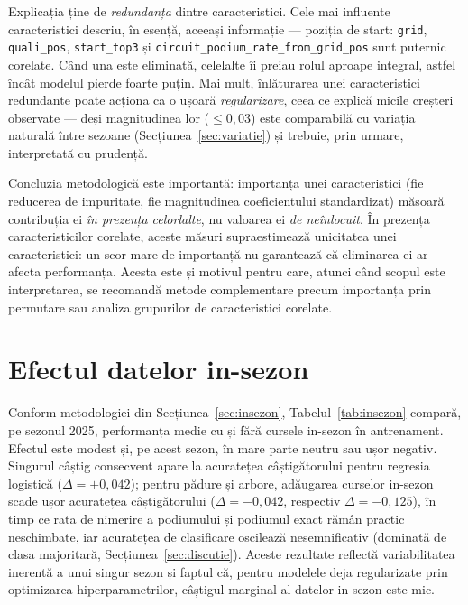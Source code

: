 \documentclass[12pt,a4paper]{report}
\begin{document}
Explicația ține de \emph{redundanța} dintre caracteristici. Cele mai influente caracteristici descriu,
în esență, aceeași informație --- poziția de start: \texttt{grid}, \texttt{quali\_pos},
\texttt{start\_top3} și \texttt{circuit\_podium\_rate\_from\_grid\_pos} sunt puternic corelate. Când
una este eliminată, celelalte îi preiau rolul aproape integral, astfel încât modelul pierde foarte
puțin. Mai mult, înlăturarea unei caracteristici redundante poate acționa ca o ușoară
\emph{regularizare}, ceea ce explică micile creșteri observate --- deși magnitudinea lor
($\le 0{,}03$) este comparabilă cu variația naturală între sezoane (Secțiunea~\ref{sec:variatie}) și
trebuie, prin urmare, interpretată cu prudență.

Concluzia metodologică este importantă: importanța unei caracteristici (fie reducerea de impuritate,
fie magnitudinea coeficientului standardizat) măsoară contribuția ei \emph{în prezența celorlalte}, nu
valoarea ei \emph{de neînlocuit}. În prezența caracteristicilor corelate, aceste măsuri supraestimează
unicitatea unei caracteristici: un scor mare de importanță nu garantează că eliminarea ei ar afecta
performanța. Acesta este și motivul pentru care, atunci când scopul este interpretarea, se recomandă
metode complementare precum importanța prin permutare sau analiza grupurilor de caracteristici
corelate.

\section{Efectul datelor in-sezon}
\label{sec:rezinsezon}

Conform metodologiei din Secțiunea~\ref{sec:insezon}, Tabelul~\ref{tab:insezon} compară, pe
sezonul 2025, performanța medie cu și fără cursele in-sezon în antrenament. Efectul este modest și,
pe acest sezon, în mare parte neutru sau ușor negativ. Singurul câștig consecvent apare la
acuratețea câștigătorului pentru regresia logistică ($\Delta = +0{,}042$); pentru pădure și arbore,
adăugarea curselor in-sezon scade ușor acuratețea câștigătorului ($\Delta = -0{,}042$, respectiv
$\Delta = -0{,}125$), în timp ce rata de nimerire a podiumului și podiumul exact rămân practic
neschimbate, iar acuratețea de clasificare oscilează nesemnificativ (dominată de clasa majoritară,
Secțiunea~\ref{sec:discutie}). Aceste rezultate reflectă variabilitatea inerentă a unui singur
sezon și faptul că, pentru modelele deja regularizate prin optimizarea hiperparametrilor, câștigul
marginal al datelor in-sezon este mic.
\end{document}
